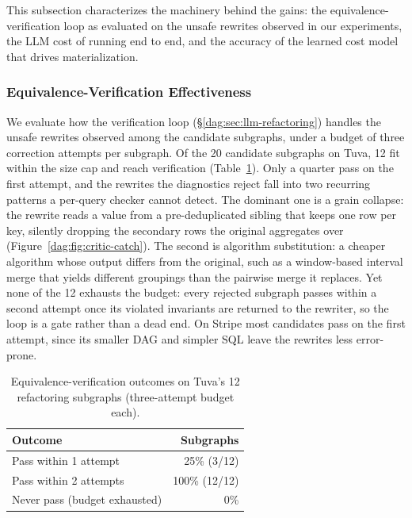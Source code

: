This subsection characterizes the machinery behind the gains: the equivalence-verification loop as evaluated on the unsafe rewrites observed in our experiments, the LLM cost of running \dagsmith{} end to end, and the accuracy of the learned cost model that drives materialization.

\subsubsection{Equivalence-Verification Effectiveness}
\label{dag:sec:eval-verification}

We evaluate how the verification loop (\S\ref{dag:sec:llm-refactoring}) handles the unsafe rewrites observed among the candidate subgraphs, under a budget of three correction attempts per subgraph. Of the 20 candidate subgraphs on Tuva, 12 fit within the size cap and reach verification (Table~\ref{dag:tab:verification}). Only a quarter pass on the first attempt, and the rewrites the diagnostics reject fall into two recurring patterns a per-query checker cannot detect. The dominant one is a grain collapse: the rewrite reads a value from a pre-deduplicated sibling that keeps one row per key, silently dropping the secondary rows the original aggregates over (Figure~\ref{dag:fig:critic-catch}). The second is algorithm substitution: a cheaper algorithm whose output differs from the original, such as a window-based interval merge that yields different groupings than the pairwise merge it replaces. Yet none of the 12 exhausts the budget: every rejected subgraph passes within a second attempt once its violated invariants are returned to the rewriter, so the loop is a gate rather than a dead end. On Stripe most candidates pass on the first attempt, since its smaller DAG and simpler SQL leave the rewrites less error-prone.

\begin{table}[tb]
\centering
\caption{Equivalence-verification outcomes on Tuva's 12 refactoring subgraphs (three-attempt budget each).}
\inv
\label{dag:tab:verification}
\small
\begin{tabular}{lr}
\toprule
Outcome & Subgraphs \\
\midrule
Pass within 1 attempt        & 25\% (3/12) \\
Pass within 2 attempts       & 100\% (12/12) \\
Never pass (budget exhausted) & 0\% \\
\bottomrule
\end{tabular}
\end{table}

